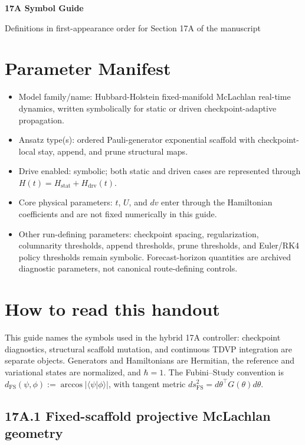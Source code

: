 \documentclass[10pt]{article}
\begin{document}
\small

{\LARGE \textbf{17A Symbol Guide}}\par
{\large Definitions in first-appearance order for Section 17A of the manuscript}\par

\section*{Parameter Manifest}
\begin{itemize}
\item Model family/name: Hubbard-Holstein fixed-manifold McLachlan real-time dynamics, written symbolically for static or driven checkpoint-adaptive propagation.
\item Ansatz type(s): ordered Pauli-generator exponential scaffold with checkpoint-local stay, append, and prune structural maps.
\item Drive enabled: symbolic; both static and driven cases are represented through $H(t)=H_{\mathrm{stat}}+H_{\mathrm{drv}}(t)$.
\item Core physical parameters: $t$, $U$, and $dv$ enter through the Hamiltonian coefficients and are not fixed numerically in this guide.
\item Other run-defining parameters: checkpoint spacing, regularization, columnarity thresholds, append thresholds, prune thresholds, and Euler/RK4 policy thresholds remain symbolic. Forecast-horizon quantities are archived diagnostic parameters, not canonical route-defining controls.
\end{itemize}

\section*{How to read this handout}
This guide names the symbols used in the hybrid 17A controller: checkpoint diagnostics, structural scaffold mutation, and continuous TDVP integration are separate objects. Generators and Hamiltonians are Hermitian, the reference and variational states are normalized, and $\hbar=1$. The Fubini--Study convention is $d_{\mathrm{FS}}(\psi,\phi):=\arccos|\langle\psi|\phi\rangle|$, with tangent metric $ds_{\mathrm{FS}}^2=d\theta^\top G(\theta)d\theta$.

\subsection*{17A.1 Fixed-scaffold projective McLachlan geometry}
\end{document}
